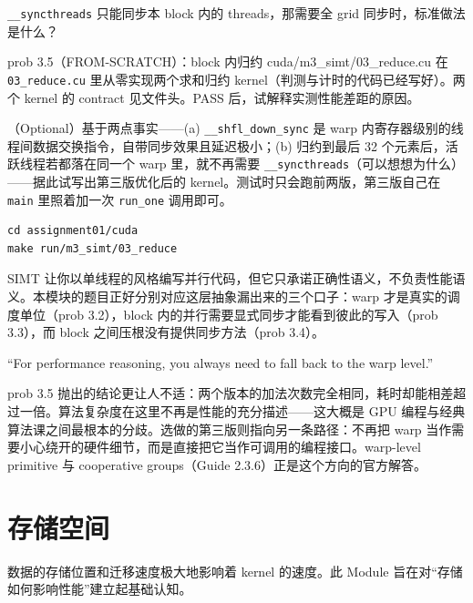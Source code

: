 \documentclass[11pt,a4paper,fontset=none]{ctexart}
\begin{document}
\texttt{\_\_syncthreads} 只能同步本 block 内的 threads，那需要全 grid 同步时，标准做法是什么？


\begin{capstone}{prob 3.5（FROM-SCRATCH）：block 内归约 \hfill {\footnotesize\ttfamily cuda/m3\_simt/03\_reduce.cu}}
在 \texttt{03\_reduce.cu} 里从零实现两个求和归约 kernel（判测与计时的代码已经写好）。两个 kernel 的 contract 见文件头。PASS 后，试解释实测性能差距的原因。

（Optional）基于两点事实——(a) \texttt{\_\_shfl\_down\_sync} 是 warp 内寄存器级别的线程间数据交换指令，自带同步效果且延迟极小；(b) 归约到最后 32 个元素后，活跃线程若都落在同一个 warp 里，就不再需要 \texttt{\_\_syncthreads}（可以想想为什么）——据此试写出第三版优化后的 kernel。测试时只会跑前两版，第三版自己在 \texttt{main} 里照着加一次 \texttt{run\_one} 调用即可。
\end{capstone}

\begin{lstlisting}
cd assignment01/cuda
make run/m3_simt/03_reduce
\end{lstlisting}

\begin{lookback}
SIMT 让你以单线程的风格编写并行代码，但它只承诺正确性语义，不负责性能语义。本模块的题目正好分别对应这层抽象漏出来的三个口子：warp 才是真实的调度单位（prob 3.2），block 内的并行需要显式同步才能看到彼此的写入（prob 3.3），而 block 之间压根没有提供同步方法（prob 3.4）。

``For performance reasoning, you always need to fall back to the warp level.''

prob 3.5 抛出的结论更让人不适：两个版本的加法次数完全相同，耗时却能相差超过一倍。算法复杂度在这里不再是性能的充分描述——这大概是 GPU 编程与经典算法课之间最根本的分歧。选做的第三版则指向另一条路径：不再把 warp 当作需要小心绕开的硬件细节，而是直接把它当作可调用的编程接口。warp-level primitive 与 cooperative groups（Guide 2.3.6）正是这个方向的官方解答。
\end{lookback}

\section{存储空间}

数据的存储位置和迁移速度极大地影响着 kernel 的速度。此 Module 旨在对“存储如何影响性能”建立起基础认知。
\end{document}
